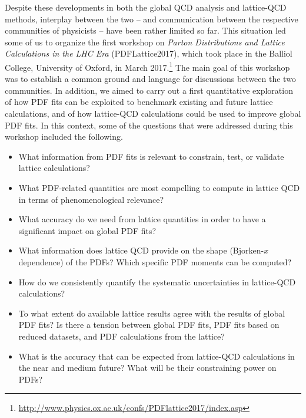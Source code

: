 Despite these developments in both the global QCD analysis and lattice-QCD 
methods, interplay between the two -- and communication between the 
respective communities of physicists -- have been rather limited so far.
%
This situation led some of us to organize the first workshop on
{\it Parton Distributions and Lattice Calculations in the LHC Era}
(PDFLattice2017), which took place in the Balliol College, University of 
Oxford, in March 2017.\footnote{\url{http://www.physics.ox.ac.uk/confs/PDFlattice2017/index.asp}}
%
The main goal of this workshop was to establish a common ground 
and language for discussions between the two communities.
%
In addition, we aimed to carry out a first quantitative exploration of how PDF 
fits can be exploited to benchmark existing and future lattice calculations,
and of how lattice-QCD calculations could be used to improve global PDF fits.
%
In this context, some of the questions that were addressed during this workshop
included the following.
\begin{itemize}
\item What information from PDF fits is relevant to constrain, 
  test, or validate lattice calculations?

\item What PDF-related quantities are most compelling
  to compute in lattice QCD in terms of phenomenological relevance?

\item What accuracy do we need from lattice quantities 
  in order to have a significant impact on global PDF fits?

\item What information does lattice QCD provide on the
  shape (Bjorken-$x$ dependence) of the PDFs? Which specific
  PDF moments can be computed?
  
\item How do we consistently quantify the systematic uncertainties 
  in lattice-QCD calculations?

\item To what extent do available lattice results agree with the results of
  global PDF fits? Is there a tension between global PDF fits, PDF
  fits based on reduced datasets, and PDF calculations from the lattice?

\item What is the accuracy that can be expected from lattice-QCD
  calculations in the near and medium future? What will be their
  constraining power on PDFs?

\end{itemize}

